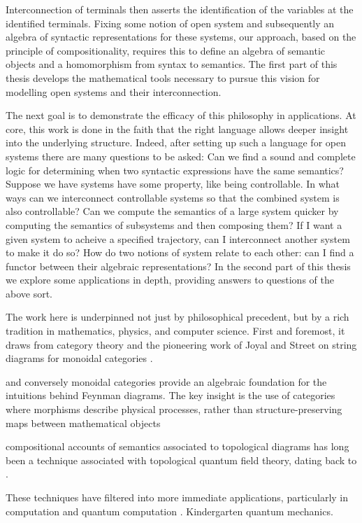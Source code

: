 Interconnection of terminals then asserts the identification of the variables at
the identified terminals. Fixing some notion of open system and subsequently an
algebra of syntactic representations for these systems, our approach, based on
the principle of compositionality, requires this to define an algebra of
semantic objects and a homomorphism from syntax to semantics. The first part of
this thesis develops the mathematical tools necessary to pursue this vision for
modelling open systems and their interconnection. 

The next goal is to demonstrate the efficacy of this philosophy in applications.
At core, this work is done in the faith that the right language allows deeper
insight into the underlying structure. Indeed, after setting up such a language
for open systems there are many questions to be asked: Can we find a sound and
complete logic for determining when two syntactic expressions have the same
semantics? Suppose we have systems have some property, like being controllable.
In what ways can we interconnect controllable systems so that the combined
system is also controllable? Can we compute the semantics of a large system
quicker by computing the semantics of subsystems and then composing them?  If I
want a given system to acheive a specified trajectory, can I interconnect
another system to make it do so? How do two notions of system relate to each
other: can I find a functor between their algebraic representations? In the
second part of this thesis we explore some applications in depth, providing
answers to questions of the above sort.

The work here is underpinned not just by philosophical precedent, but by a rich
tradition in mathematics, physics, and computer science. First and foremost, it
draws from category theory and the pioneering work of Joyal and
Street on string diagrams for monoidal categories \cite{JS91,JS93}.

and conversely monoidal categories
provide an algebraic foundation for the intuitions behind Feynman diagrams.  The
key insight is the use of categories where morphisms describe physical
processes, rather than structure-preserving maps between mathematical objects
\cite{BaezStay,CP}
 
  compositional accounts of semantics associated to topological
diagrams has long been a technique associated with topological
quantum field theory, dating back to \cite{At}.

These techniques have filtered into more immediate applications, particularly in
computation and quantum computation \cite{AC04,Ba1,Sel07}. 
Kindergarten quantum mechanics. 

